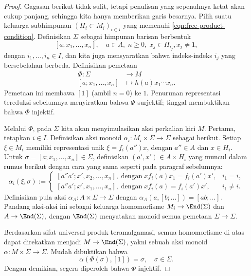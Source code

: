 \begin{proof}
	Gagasan berikut tidak sulit, tetapi penulisan yang sepenuhnya ketat akan cukup panjang, sehingga kita hanya memberikan garis besarnya. Pilih suatu keluarga subhimpunan $(H_i \subset M_i)_{i \in I}$ yang memenuhi \eqref{eqn:free-product-condition}. Definisikan $\Sigma$ sebagai himpunan barisan berbentuk
	\[ [a; x_1, \ldots, x_n], \quad a \in A, \; n \geq 0, \; x_j \in H_{i_j}, x_j \neq 1, \]
	dengan $i_1, \ldots, i_n \in I$, dan kita juga mensyaratkan bahwa indeks-indeks $i_j$ yang bersebelahan berbeda. Definisikan pemetaan
	\begin{align*}
		\Phi: \Sigma & \longrightarrow M \\
		[a; x_1, \ldots, x_n] & \longmapsto h(a)x_1 \cdots x_n.
	\end{align*}
	Pemetaan ini membawa $[1]$ (ambil $n=0$) ke $1$. Penurunan representasi tereduksi sebelumnya menyiratkan bahwa $\Phi$ surjektif; tinggal membuktikan bahwa $\Phi$ injektif.

	Melalui $\Phi$, pada $\Sigma$ kita akan menyimulasikan aksi perkalian kiri $M$. Pertama, tetapkan $i \in I$. Definisikan aksi monoid $\alpha_i: M_i \times \Sigma \to \Sigma$ sebagai berikut. Setiap $\xi \in M_i$ memiliki representasi unik $\xi = f_i(a'') x$, dengan $a'' \in A$ dan $x \in H_i$. Untuk $\sigma = [a; x_1, \ldots, x_n] \in \Sigma$, definisikan $(a', x') \in A \times H_i$ yang muncul dalam rumus berikut dengan cara yang sama seperti pada paragraf sebelumnya:
	\[ \alpha_i(\xi, \sigma) :=
	\begin{cases}
		[a'' a'; x', x_2, \ldots, x_n], \;\text{dengan}\; x f_i(a) x_1 = f_i(a') x', & i_1 = i, \\
		[a'' a'; x', x_1, \ldots, x_n], \;\text{dengan}\; x f_i(a) = f_i(a') x', & i_1 \neq i.
	\end{cases} \]
	Definisikan pula aksi $\alpha_A: A \times \Sigma \to \Sigma$ dengan $\alpha_A(a, [b; \ldots]) = [ab; \ldots]$. Pandang aksi-aksi ini sebagai keluarga homomorfisme $M_i \to \End(\Sigma)$ dan $A \to \End(\Sigma)$, dengan $\End(\Sigma)$ menyatakan monoid semua pemetaan $\Sigma \to \Sigma$.

	Berdasarkan sifat universal produk teramalgamasi, semua homomorfisme di atas dapat direkatkan menjadi $M \to \End(\Sigma)$, yakni sebuah aksi monoid $\alpha: M \times \Sigma \to \Sigma$. Mudah dibuktikan bahwa
	\[ \alpha(\Phi(\sigma), [1]) = \sigma, \quad \sigma \in \Sigma. \]
	Dengan demikian, segera diperoleh bahwa $\Phi$ injektif.
\end{proof}

